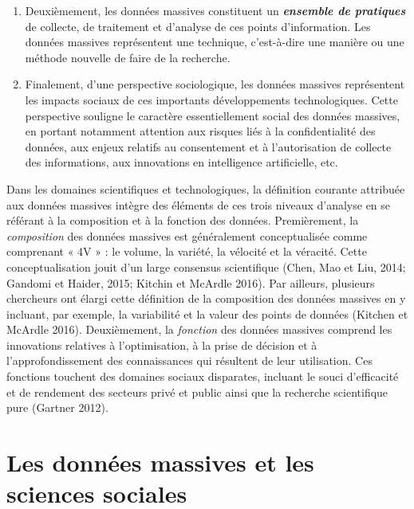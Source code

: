 \documentclass[
  letterpaper,
  DIV=11,
  numbers=noendperiod]{scrreprt}
\begin{document}
\begin{enumerate}
\def\labelenumi{\arabic{enumi}.}
\setcounter{enumi}{1}
\item
  Deuxièmement, les données massives constituent un
  \textbf{\emph{ensemble de pratiques}} de collecte, de traitement et
  d'analyse de ces points d'information. Les données massives
  représentent une technique, c'est-à-dire une manière ou une méthode
  nouvelle de faire de la recherche.
\item
  Finalement, d'une perspective sociologique, les données massives
  représentent les impacts sociaux de ces importants développements
  technologiques. Cette perspective souligne le caractère
  essentiellement social des données massives, en portant notamment
  attention aux risques liés à la confidentialité des données, aux
  enjeux relatifs au consentement et à l'autorisation de collecte des
  informations, aux innovations en intelligence artificielle, etc.
\end{enumerate}

Dans les domaines scientifiques et technologiques, la définition
courante attribuée aux données massives intègre des éléments de ces
trois niveaux d'analyse en se référant à la composition et à la fonction
des données. Premièrement, la \emph{composition} des données massives
est généralement conceptualisée comme comprenant « 4V » : le volume, la
variété, la vélocité et la véracité. Cette conceptualisation jouit d'un
large consensus scientifique (Chen, Mao et Liu, 2014; Gandomi et Haider,
2015; Kitchin et McArdle 2016). Par ailleurs, plusieurs chercheurs ont
élargi cette définition de la composition des données massives en y
incluant, par exemple, la variabilité et la valeur des points de données
(Kitchen et McArdle 2016). Deuxièmement, la \emph{fonction} des données
massives comprend les innovations relatives à l'optimisation, à la prise
de décision et à l'approfondissement des connaissances qui résultent de
leur utilisation. Ces fonctions touchent des domaines sociaux
disparates, incluant le souci d'efficacité et de rendement des secteurs
privé et public ainsi que la recherche scientifique pure (Gartner 2012).

\section*{Les données massives et les sciences
sociales}\label{les-donnuxe9es-massives-et-les-sciences-sociales}
\end{document}
